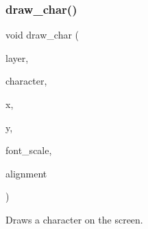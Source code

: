 \subsubsection{\texorpdfstring{draw\+\_\+char()}{draw\_char()}}
{\footnotesize\ttfamily void draw\+\_\+char (\begin{DoxyParamCaption}\item[{\mbox{\hyperlink{struct_layer}{Layer}} $\ast$}]{layer,  }\item[{char}]{character,  }\item[{int16\+\_\+t}]{x,  }\item[{int16\+\_\+t}]{y,  }\item[{uint16\+\_\+t}]{font\+\_\+scale,  }\item[{\mbox{\hyperlink{group__textbox_gaa56f1a82069b5feeadbb4591cb3e474f}{Text\+Alignment}}}]{alignment }\end{DoxyParamCaption})}



Draws a character on the screen. 



